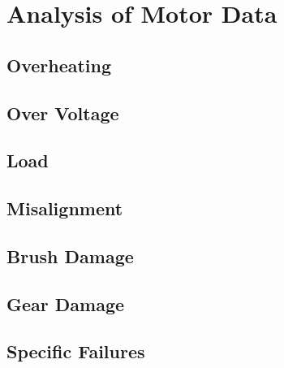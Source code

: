 \section{Analysis of Motor Data}

\subsection{Overheating}



\subsection{Over Voltage}

\subsection{Load}

\subsection{Misalignment}

\subsection{Brush Damage}

\subsection{Gear Damage}

\subsection{Specific Failures}